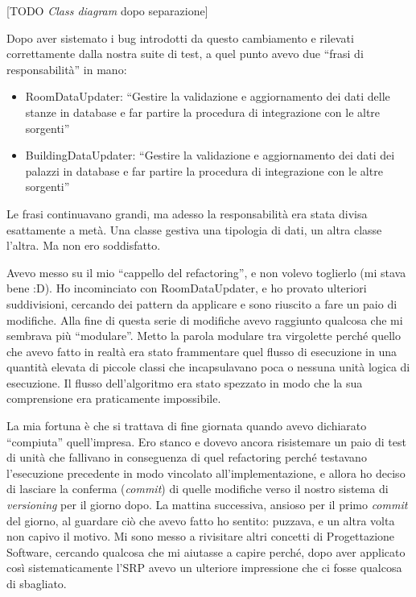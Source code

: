 \documentclass[12pt]{report}
\begin{document}
[TODO \textit{Class diagram} dopo separazione]

Dopo aver sistemato i bug introdotti da questo cambiamento e rilevati 
correttamente dalla nostra suite di test, a quel punto avevo due 
``frasi di responsabilità'' in mano:

\begin{itemize}
  \item RoomDataUpdater: ``Gestire la validazione e aggiornamento dei dati delle
  stanze in database e far partire la procedura di integrazione
con le altre sorgenti''
  \item BuildingDataUpdater: ``Gestire la validazione e aggiornamento dei dati 
  dei palazzi in database e far partire la procedura di integrazione
con le altre sorgenti''
\end{itemize}

Le frasi continuavano grandi, ma adesso la responsabilità era stata divisa
esattamente a metà. Una classe gestiva una tipologia di dati, un 
altra classe l'altra. Ma non ero soddisfatto. 

Avevo messo su il mio ``cappello del refactoring'', e non
volevo toglierlo (mi stava bene :D). Ho incominciato con RoomDataUpdater,
e ho provato ulteriori suddivisioni, cercando dei pattern 
da applicare e sono riuscito a fare un paio di modifiche. Alla fine di questa
serie di modifiche avevo raggiunto qualcosa che mi sembrava più ``modulare''.
Metto la parola modulare tra virgolette perché quello che avevo fatto in realtà
era stato frammentare quel flusso di esecuzione in una quantità elevata di
piccole classi che incapsulavano poca o nessuna unità logica di 
esecuzione. Il flusso dell'algoritmo era stato spezzato in modo che la sua
comprensione era praticamente impossibile.

La mia fortuna è che si trattava di fine giornata quando avevo dichiarato 
``compiuta'' quell'impresa. Ero stanco e dovevo ancora risistemare un paio
di test di unità che fallivano in conseguenza di quel refactoring perché
testavano l'esecuzione precedente in modo vincolato all'implementazione, e
allora ho deciso di lasciare la conferma (\textit{commit}) 
di quelle modifiche verso il nostro sistema di \textit{versioning}
per il giorno dopo.
La mattina successiva, ansioso per il primo \textit{commit} del giorno,
al guardare ciò che avevo fatto ho sentito: puzzava, e un altra volta non
capivo il motivo.
Mi sono messo a rivisitare altri concetti di Progettazione 
Software, cercando qualcosa che mi
aiutasse a capire perché, dopo aver applicato così sistematicamente l'SRP
avevo un ulteriore impressione che ci fosse qualcosa di sbagliato.
\end{document}

